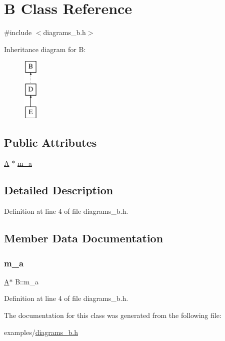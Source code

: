 \hypertarget{class_b}{}\section{B Class Reference}
\label{class_b}


{\ttfamily \#include $<$diagrams\+\_\+b.\+h$>$}

Inheritance diagram for B\+:\begin{figure}[H]
\begin{center}
\leavevmode
\includegraphics[height=3.000000cm]{class_b}
\end{center}
\end{figure}
\subsection*{Public Attributes}
\begin{DoxyCompactItemize}
\item 
\mbox{\hyperlink{class_a}{A}} $\ast$ \mbox{\hyperlink{class_b_a26c70b64fe7cf17fcced7755ecff7537}{m\+\_\+a}}
\end{DoxyCompactItemize}


\subsection{Detailed Description}


Definition at line 4 of file diagrams\+\_\+b.\+h.



\subsection{Member Data Documentation}
\mbox{\label{class_b_a26c70b64fe7cf17fcced7755ecff7537}} 
\subsubsection{\texorpdfstring{m\_a}{m\_a}}
{\footnotesize\ttfamily \mbox{\hyperlink{class_a}{A}}$\ast$ B\+::m\+\_\+a}



Definition at line 4 of file diagrams\+\_\+b.\+h.



The documentation for this class was generated from the following file\+:\begin{DoxyCompactItemize}
\item 
examples/\mbox{\hyperlink{diagrams__b_8h}{diagrams\+\_\+b.\+h}}\end{DoxyCompactItemize}
